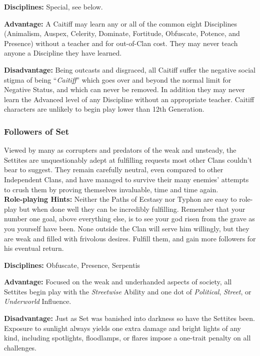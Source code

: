 \textbf{Disciplines:}  Special, see below.

\textbf{Advantage:}  A Caitiff may learn any or all of the common eight Disciplines 
(Animalism, Auspex, Celerity, Dominate, Fortitude, Obfuscate, Potence, and Presence) 
without a teacher and for out-of-Clan cost.  They may never teach anyone a Discipline 
they have learned.

\textbf{Disadvantage:}  Being outcasts and disgraced, all Caitiff suffer the negative 
social stigma of being ``\emph{Caitiff}'' which goes over and beyond the normal limit for 
Negative Status, and which can never be removed.  In addition they may never learn the 
Advanced level of any Discipline without an appropriate teacher.  Caitiff characters are 
unlikely to begin play lower than 12th Generation.

\subsubsection{Followers of Set}
Viewed by many as corrupters and predators of the weak and unsteady, the Settites 
are unquestionably adept at fulfilling requests most other Clans couldn't bear to 
suggest.  They remain carefully neutral, even compared to other Independent Clans, 
and have managed to survive their many enemies' attempts to crush them by proving 
themselves invaluable, time and time again. \\

\textbf{Role-playing Hints:}  Neither the Paths of Ecstasy nor Typhon are easy to 
role-play but when done well they can be incredibly fulfilling.  Remember that your 
number one goal, above everything else, is to see your god risen from the grave as 
you yourself have been. None outside the Clan will serve him willingly, but they 
are weak and filled with frivolous desires.  Fulfill them, and gain more followers 
for his eventual return.

\textbf{Disciplines:}  Obfuscate, Presence, Serpentis

\textbf{Advantage:}  Focused on the weak and underhanded aspects of society, all 
Settites begin play with the \emph{Streetwise} Ability and one dot of \emph{Political}, 
\emph{Street}, or \emph{Underworld} Influence.

\textbf{Disadvantage:}  Just as Set was banished into darkness so have the 
Settites been.  Exposure to sunlight always yields one extra damage and bright lights 
of any kind, including spotlights, floodlamps, or flares impose a one-trait penalty 
on all challenges.


